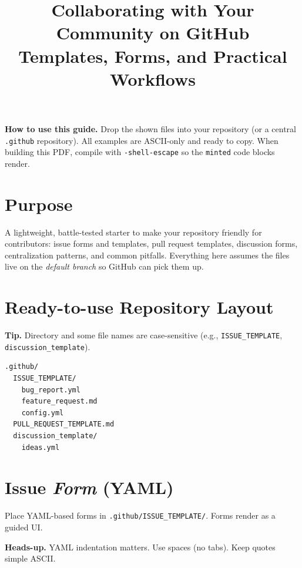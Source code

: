 \documentclass[11pt]{article}
\title{\textbf{Collaborating with Your Community on GitHub}\\
\large Templates, Forms, and Practical Workflows}
\author{}
\date{}
\begin{document}
\maketitle
\vspace{-0.75em}
\begin{tcolorbox}
\textbf{How to use this guide.}
Drop the shown files into your repository (or a central \texttt{.github} repository).
All examples are ASCII-only and ready to copy.
When building this PDF, compile with \texttt{-shell-escape} so the \texttt{minted} code blocks render.
\end{tcolorbox}

\tableofcontents
\clearpage

\section{Purpose}
A lightweight, battle-tested starter to make your repository friendly for contributors:
issue forms and templates, pull request templates, discussion forms, centralization patterns, and common pitfalls.
Everything here assumes the files live on the \emph{default branch} so GitHub can pick them up.

\section{Ready-to-use Repository Layout}
\begin{tcolorbox}
\textbf{Tip.} Directory and some file names are case-sensitive (e.g., \nolinkurl{ISSUE_TEMPLATE}, \nolinkurl{discussion_template}).
\end{tcolorbox}

\begin{verbatim}
.github/
  ISSUE_TEMPLATE/
    bug_report.yml
    feature_request.md
    config.yml
  PULL_REQUEST_TEMPLATE.md
  discussion_template/
    ideas.yml
\end{verbatim}
\clearpage

\section{Issue \emph{Form} (YAML)}
Place YAML-based forms in \texttt{.github/ISSUE\_TEMPLATE/}. Forms render as a guided UI.
\begin{tcolorbox}
\textbf{Heads-up.} YAML indentation matters. Use spaces (no tabs). Keep quotes simple ASCII.
\end{tcolorbox}
\end{document}
